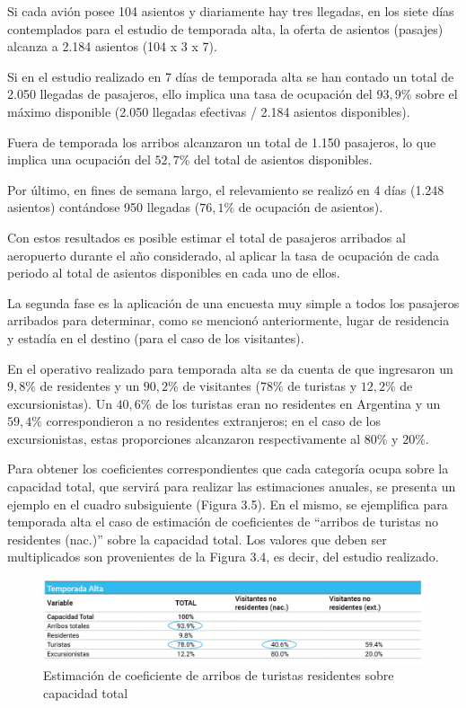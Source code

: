 \documentclass[
]{book}
\begin{document}
Si cada avión posee 104 asientos y diariamente hay tres llegadas, en los siete días contemplados para el estudio de temporada alta, la oferta de asientos (pasajes) alcanza a 2.184 asientos (104 x 3 x 7).

Si en el estudio realizado en 7 días de temporada alta se han contado un total de 2.050 llegadas de pasajeros, ello implica una tasa de ocupación del \(93,9\%\) sobre el máximo disponible (2.050 llegadas efectivas / 2.184 asientos disponibles).

Fuera de temporada los arribos alcanzaron un total de 1.150 pasajeros, lo que implica una ocupación del \(52,7\%\) del total de asientos disponibles.

Por último, en fines de semana largo, el relevamiento se realizó en 4 días (1.248 asientos) contándose 950 llegadas (\(76,1\%\) de ocupación de asientos).

Con estos resultados es posible estimar el total de pasajeros arribados al aeropuerto durante el año considerado, al aplicar la tasa de ocupación de cada periodo al total de asientos disponibles en cada uno de ellos.

La segunda fase es la aplicación de una encuesta muy simple a todos los pasajeros arribados para determinar, como se mencionó anteriormente, lugar de residencia y estadía en el destino (para el caso de los visitantes).

En el operativo realizado para temporada alta se da cuenta de que ingresaron un \(9,8\%\) de residentes y un \(90,2\%\) de visitantes (\(78\%\) de turistas y \(12,2\%\) de excursionistas). Un \(40,6\%\) de los turistas eran no residentes en Argentina y un \(59,4\%\) correspondieron a no residentes extranjeros; en el caso de los excursionistas, estas proporciones alcanzaron respectivamente al \(80\%\) y \(20\%\).

Para obtener los coeficientes correspondientes que cada categoría ocupa sobre la capacidad total, que servirá para realizar las estimaciones anuales, se presenta un ejemplo en el cuadro subsiguiente (Figura 3.5). En el mismo, se ejemplifica para temporada alta el caso de estimación de coeficientes de ``arribos de turistas no residentes (nac.)'' sobre la capacidad total. Los valores que deben ser multiplicados son provenientes de la Figura 3.4, es decir, del estudio realizado.

\begin{figure}

{\centering \includegraphics[width=0.8\linewidth]{imagenes/figura07} 

}

\caption{Estimación de coeficiente de arribos de turistas residentes sobre capacidad total}\label{fig:arribosdeturistas}
\end{figure}
\end{document}
